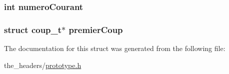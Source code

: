 \subsubsection[{\texorpdfstring{numero\+Courant}{numeroCourant}}]{\setlength{\rightskip}{0pt plus 5cm}int numero\+Courant}\hypertarget{structliste_coup__t_afeec6c52a772886929f8a6863490ff6c}{}\label{structliste_coup__t_afeec6c52a772886929f8a6863490ff6c}
\subsubsection[{\texorpdfstring{premier\+Coup}{premierCoup}}]{\setlength{\rightskip}{0pt plus 5cm}struct {\bf coup\+\_\+t}$\ast$ premier\+Coup}\hypertarget{structliste_coup__t_a180af4ccdf501202989db6beffd4f9bb}{}\label{structliste_coup__t_a180af4ccdf501202989db6beffd4f9bb}


The documentation for this struct was generated from the following file\+:\begin{DoxyCompactItemize}
\item 
the\+\_\+headers/\hyperlink{prototype_8h}{prototype.\+h}\end{DoxyCompactItemize}
